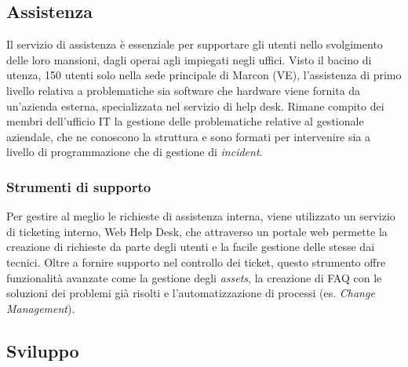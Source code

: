 \subsection{Assistenza}

Il servizio di assistenza è essenziale per supportare gli utenti nello svolgimento delle loro mansioni, dagli operai agli impiegati negli uffici. Visto il bacino di utenza, 150 utenti solo nella sede principale di Marcon (VE), l'assistenza di primo livello relativa a problematiche sia software che hardware viene fornita da un'azienda esterna, specializzata nel servizio di help desk. Rimane compito dei membri dell'ufficio IT la gestione delle problematiche relative al gestionale aziendale, che ne conoscono la struttura e sono formati per intervenire sia a livello di programmazione che di gestione di \textit{incident}. 



\subsubsection{Strumenti di supporto}

Per gestire al meglio le richieste di assistenza interna, viene utilizzato un servizio di ticketing interno, Web Help Desk, che attraverso un portale web permette la creazione di richieste da parte degli utenti e la facile gestione delle stesse dai tecnici. Oltre a fornire supporto nel controllo dei ticket, questo strumento offre funzionalità avanzate come la gestione degli \textit{assets}, la creazione di FAQ con le soluzioni dei problemi già risolti e l'automatizzazione di processi (es. \textit{Change Management}).


\subsection{Sviluppo}

